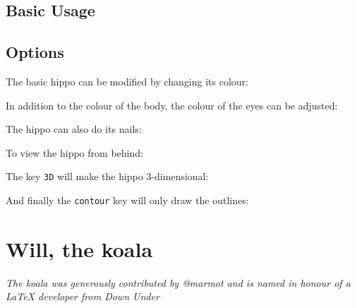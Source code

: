 \documentclass[parskip=half]{scrartcl}
\begin{document}
\subsection{Basic Usage}

\begin{tcblisting}{}
\hippo
\end{tcblisting}

\subsection{Options}

The basic hippo can be modified by changing its colour:
\begin{tcblisting}{}
\hippo[body=blue]
\end{tcblisting}

In addition to the colour of the body, the colour of the eyes can be adjusted:
\begin{tcblisting}{}
\hippo[eye=red]
\end{tcblisting}
\begin{tcblisting}{}
\hippo[pupil=red]
\end{tcblisting}

The hippo can also do its nails:
\begin{tcblisting}{}
\hippo[toes=red]
\end{tcblisting}

To view the hippo from behind:
\begin{tcblisting}{}
\hippo[back]
\end{tcblisting}

The key \lstinline|3D| will make the hippo 3-dimensional:
\begin{tcblisting}{}
\hippo[3D]
\end{tcblisting}

And finally the \lstinline|contour| key will only draw the outlines:
\begin{tcblisting}{}
\hippo[contour=black]
\end{tcblisting}

%
%
\clearpage
\section[Koala]{Will, the koala}

\emph{The koala was generously contributed by @marmot and is named in honour of a \LaTeX{} developer from Down Under}
\end{document}
